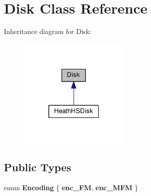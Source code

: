 \hypertarget{classDisk}{}\section{Disk Class Reference}
\label{classDisk}


Inheritance diagram for Disk\+:\nopagebreak
\begin{figure}[H]
\begin{center}
\leavevmode
\includegraphics[width=157pt]{classDisk__inherit__graph}
\end{center}
\end{figure}
\subsection*{Public Types}
\begin{DoxyCompactItemize}
\item 
\hypertarget{classDisk_a2eaa045357515c1586d007fb0698fce3}{}enum {\bfseries Encoding} \{ {\bfseries enc\+\_\+\+F\+M}, 
{\bfseries enc\+\_\+\+M\+F\+M}
 \}\label{classDisk_a2eaa045357515c1586d007fb0698fce3}

\end{DoxyCompactItemize}
